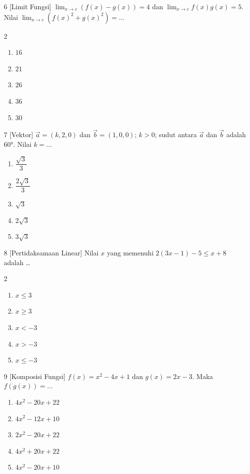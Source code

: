 \documentclass[11pt]{article}
\newenvironment{pil}{%
  \begin{enumerate}[label=(\alph*),leftmargin=*,itemsep=1pt,topsep=3pt]}%
  {\end{enumerate}}
\newenvironment{pilB}{%
  \par\smallskip\begin{multicols}{2}
  \begin{enumerate}[label=(\alph*),leftmargin=*,itemsep=1pt,topsep=3pt]}%
  {\end{enumerate}\end{multicols}}
\begin{document}
\begin{soal}{6 \normalfont\small[Limit Fungsi]}
$\displaystyle\lim_{x\to c}(f(x)-g(x))=4$ dan $\displaystyle\lim_{x\to c}f(x)g(x)=5$.
Nilai $\displaystyle\lim_{x\to c}(f(x)^2+g(x)^2)=\ldots$
\begin{pilB}
  \item $16$ \item $21$ \item $26$ \item $36$ \item $30$
\end{pilB}
\end{soal}

\begin{soal}{7 \normalfont\small[Vektor]}
$\vec{a}=(k,2,0)$ dan $\vec{b}=(1,0,0)$; $k>0$; sudut antara $\vec{a}$ dan $\vec{b}$ adalah $60°$.
Nilai $k=\ldots$
\begin{pil}
  \item $\dfrac{\sqrt{3}}{3}$ \item $\dfrac{2\sqrt{3}}{3}$ \item $\sqrt{3}$ \item $2\sqrt{3}$ \item $3\sqrt{3}$
\end{pil}
\end{soal}

\begin{soal}{8 \normalfont\small[Pertidaksamaan Linear]}
Nilai $x$ yang memenuhi $2(3x-1)-5\leq x+8$ adalah \ldots
\begin{pilB}
  \item $x\leq3$ \item $x\geq3$ \item $x<-3$ \item $x>-3$ \item $x\leq-3$
\end{pilB}
\end{soal}

\begin{soal}{9 \normalfont\small[Komposisi Fungsi]}
$f(x)=x^2-4x+1$ dan $g(x)=2x-3$. Maka $f(g(x))=\ldots$
\begin{pil}
  \item $4x^2-20x+22$ \item $4x^2-12x+10$
  \item $2x^2-20x+22$ \item $4x^2+20x+22$ \item $4x^2-20x+10$
\end{pil}
\end{soal}
\end{document}
